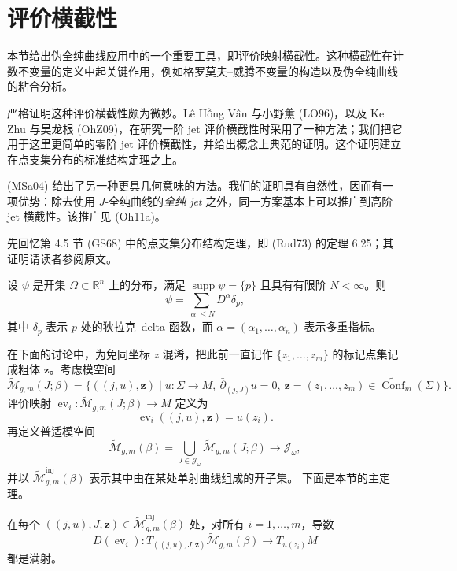 \section{评价横截性}
\label{sec:evaluation-transversality}

本节给出伪全纯曲线应用中的一个重要工具，即评价映射横截性。这种横截性在计数不变量的定义中起关键作用，例如格罗莫夫--威腾不变量的构造以及伪全纯曲线的粘合分析。

严格证明这种评价横截性颇为微妙。Lê Hồng Vân 与小野薫 (LO96)，以及 Ke Zhu 与吴龙根 (OhZ09)，在研究一阶 jet 评价横截性时采用了一种方法；我们把它用于这里更简单的零阶 jet 评价横截性，并给出概念上典范的证明。这个证明建立在点支集分布的标准结构定理之上。

(MSa04) 给出了另一种更具几何意味的方法。我们的证明具有自然性，因而有一项优势：除去使用 $J$-全纯曲线的\emph{全纯 jet} 之外，同一方案基本上可以推广到高阶 jet 横截性。该推广见 (Oh11a)。

先回忆第 4.5 节 (GS68) 中的点支集分布结构定理，即 (Rud73) 的定理 6.25；其证明请读者参阅原文。

\begin{theorem}[点支集分布]\label{thm:distribution-point-support}
设 $\psi$ 是开集 $\Omega\subset\mathbb R^n$ 上的分布，满足
$\operatorname{supp}\psi=\{p\}$ 且具有有限阶 $N<\infty$。则
\[
 \psi=\sum_{|\alpha|\leq N}D^\alpha\delta_p,
\]
其中 $\delta_p$ 表示 $p$ 处的狄拉克--delta 函数，而
$\alpha=(\alpha_1,\ldots,\alpha_n)$ 表示多重指标。
\end{theorem}

在下面的讨论中，为免同坐标 $z$ 混淆，把此前一直记作
$\{z_1,\ldots,z_m\}$ 的标记点集记成粗体
$\boldsymbol z$。考虑模空间
\[
 \widetilde{\mathcal M}_{g,m}(J;\beta)=
 \{((j,u),\boldsymbol z)\mid u:\Sigma\to M,
 \ \bar\partial_{(j,J)}u=0,
 \ \boldsymbol z=(z_1,\ldots,z_m)\in
 \widetilde{\operatorname{Conf}}_m(\Sigma)\}.
\]
评价映射
$\operatorname{ev}_i:\widetilde{\mathcal M}_{g,m}(J;\beta)\to M$ 定义为
\[
 \operatorname{ev}_i((j,u),\boldsymbol z)=u(z_i).
\]
再定义普适模空间
\[
 \widetilde{\mathcal M}_{g,m}(\beta)=
 \bigcup_{J\in\mathcal J_\omega}
 \widetilde{\mathcal M}_{g,m}(J;\beta)\longrightarrow\mathcal J_\omega,
\]
并以 $\widetilde{\mathcal M}_{g,m}^{\mathrm{inj}}(\beta)$ 表示其中由在某处单射曲线组成的开子集。
下面是本节的主定理。

\begin{theorem}[评价横截性]\label{thm:evaluation-transversality}
在每个
$((j,u),J,\boldsymbol z)\in
\widetilde{\mathcal M}_{g,m}^{\mathrm{inj}}(\beta)$ 处，对所有
$i=1,\ldots,m$，导数
\[
 D(\operatorname{ev}_i):
 T_{((j,u),J,\boldsymbol z)}\widetilde{\mathcal M}_{g,m}(\beta)
 \longrightarrow T_{u(z_i)}M
\]
都是满射。
\end{theorem}

